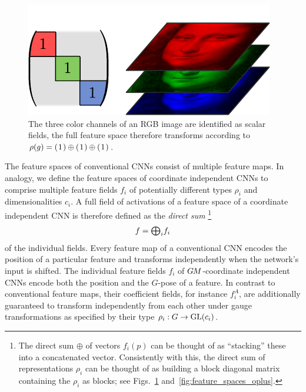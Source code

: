 \begin{figure}
    \vspace*{-4.25ex}
    \hfill
    \includegraphics[width=.95\linewidth]{figures/feature_field_RGB.pdf}%
    \vspace*{.0ex}
    \captionsetup{width=.35\textwidth}
    \caption{\small
        The three color channels of an RGB image are identified as scalar fields, the full feature space therefore transforms according to $\rho(g) = (\mkern1.5mu 1 \mkern1.5mu) \oplus (\mkern1.5mu 1 \mkern1.5mu) \oplus (\mkern1.5mu 1 \mkern1.5mu)$.
        }
    \label{fig:feature_space_RGB}
\end{figure}%
The feature spaces of conventional CNNs consist of multiple feature maps.
In analogy, we define the feature spaces of coordinate independent CNNs to comprise multiple feature fields $f_i$ of potentially different types $\rho_i$ and dimensionalities $c_i$.
A full field of activations of a feature space of a coordinate independent CNN is therefore defined as the \emph{direct sum}%
\footnote{
    The direct sum $\oplus$ of vectors $f_i(p)$ can be thought of as ``stacking'' these into a concatenated vector.
    Consistently with this, the direct sum of representations $\rho_i$ can be thought of as building a block diagonal matrix containing the $\rho_i$ as blocks; see Figs.~\ref{fig:feature_space_RGB} and~\ref{fig:feature_spaces_oplus}.
}
\begin{align}\label{eq:feature_field_full}
    f = \scalebox{1.1}{$\bigoplus$}_i f_i
\end{align}
of the individual fields.
Every feature map of a conventional CNN encodes the position of a particular feature and transforms independently when the network's input is shifted.
The individual feature fields $f_i$ of $G\mkern-1.4muM$-coordinate independent CNNs encode both the position and the $G$-pose of a feature.
In contrast to conventional feature maps, their coefficient fields, for instance $f_i^A$, are additionally guaranteed to transform independently from each other under gauge transformations as specified by their type ${\rho_i:G\to\operatorname{GL}({c_i})}$.
